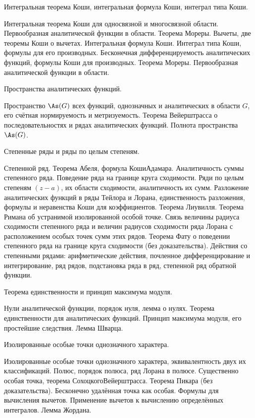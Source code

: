 \documentclass[a4paper]{article}
\begin{document}
\begin{nums}{-2}
\item Интегральная теорема Коши, интегральная формула Коши, интеграл типа Коши.

Интегральная теорема Коши для односвязной и многосвязной области. Первообразная аналитической функции в
области. Теорема Мореры. Вычеты, две теоремы Коши о вычетах. Интегральная формула Коши. Интеграл типа Коши,
формулы для его производных. Бесконечная дифференцируемость аналитических функций, формулы Коши для
производных. Теорема Мореры. Первообразная аналитической функции в области.

\item Пространства аналитических функций.

Пространство $\As(G)$ всех функций, однозначных и
аналитических в области $G$, его счётная нормируемость и метризуемость. Теорема Вейерштрасса о
последовательностях и рядах аналитических функций. Полнота пространства $\As(G)$.

\item Степенные ряды и ряды по целым степеням.

Степенной ряд. Теорема Абеля, формула Коши\ч Адамара.
Аналитичность суммы степенного ряда. Поведение ряда на границе круга сходимости. Ряди по целым степеням $(z-a)$,
их области сходимости, аналитичность их сумм. Разложение аналитических функций в ряды Тейлора и Лорана,
единственность разложения, формулы и неравенства Коши для коэффициентов. Теорема Лиувилля. Теорема Римана об
устранимой изолированной особой точке. Связь величины радиуса сходимости степенного ряда и величин
радиусов сходимости ряда Лорана с расположением особых точек сумм этих рядов. Теорема Фату о поведении
степенного ряда на границе круга сходимости (без доказательства). Действия со степенными рядами: арифметические
действия, почленное дифференцирование и интегрирование, ряд рядов, подстановка ряда в ряд, степенной ряд
обратной функции.

\item Теорема единственности и принцип максимума модуля.

Нули аналитической функции, порядок нуля, лемма о нулях.
Теорема единственности для аналитических функций. Принцип максимума модуля, его простейшие следствия. Лемма Шварца.

\item Изолированные особые точки однозначного характера.

Изолированные особые точки однозначного характера,
эквивалентность двух их классификаций. Полюс, порядок полюса, ряд Лорана в полюсе. Существенно особая точка,
теорема Сохоцкого\ч Вейерштрасса. Теорема Пикара (без доказательства). Бесконечно удалённая точка как особая.
Формулы для вычисления вычетов. Применение вычетов к вычислению определённых интегралов. Лемма Жордана.
\end{nums}
\end{document}
